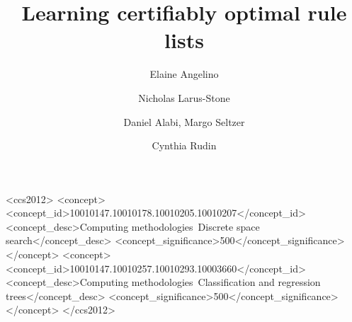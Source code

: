 \documentclass[sigconf]{acmart}
\begin{document}
\title{Learning certifiably optimal rule lists}

\author{Elaine Angelino}

%
%

\author{Nicholas Larus-Stone}
\author{Daniel Alabi, Margo Seltzer}

\author{Cynthia Rudin}

\renewcommand{\shortauthors}{E. Angelino et al.}


\begin{abstract}

\end{abstract}

\setlength{\abovedisplayskip}{3pt}
\setlength{\belowdisplayskip}{3pt}
\setlength{\belowcaptionskip}{-10pt}

%
%
\begin{CCSXML}
<ccs2012>
<concept>
<concept_id>10010147.10010178.10010205.10010207</concept_id>
<concept_desc>Computing methodologies~Discrete space search</concept_desc>
<concept_significance>500</concept_significance>
</concept>
<concept>
<concept_id>10010147.10010257.10010293.10003660</concept_id>
<concept_desc>Computing methodologies~Classification and regression trees</concept_desc>
<concept_significance>500</concept_significance>
</concept>
</ccs2012>
\end{CCSXML}
\end{document}
